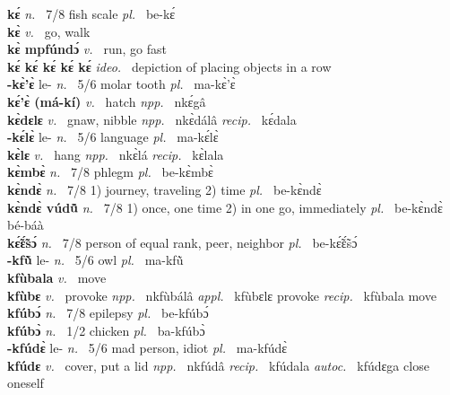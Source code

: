 {\bfseries kɛ́}  {\itshape n.~} 7/8 fish scale {\itshape pl.~} be-kɛ́    \\ 
{\bfseries kɛ̀}  {\itshape v.~} go, walk    \\ 
{\bfseries kɛ̀ mpfúndɔ́}  {\itshape v.~} run, go fast    \\ 
{\bfseries kɛ́ kɛ́ kɛ́ kɛ́ kɛ́}  {\itshape ideo.~} depiction of placing objects in a row    \\ 
{\bfseries -kɛ̀'ɛ̀} le- {\itshape n.~} 5/6 molar tooth {\itshape pl.~} ma-kɛ̀'ɛ̀    \\ 
{\bfseries kɛ́'ɛ̀ (má-kí)}  {\itshape v.~} hatch   {\itshape npp.~} nkɛ́gâ  \\ 
{\bfseries kɛ̀dɛlɛ}  {\itshape v.~} gnaw, nibble   {\itshape npp.~} nkɛ̀dálâ {\itshape recip.~} kɛ́dala  \\ 
{\bfseries -kɛ́lɛ̀} le- {\itshape n.~} 5/6 language {\itshape pl.~} ma-kɛ́lɛ̀    \\ 
{\bfseries kɛ̀lɛ}  {\itshape v.~} hang   {\itshape npp.~} nkɛ̀lá {\itshape recip.~} kɛ̀lala  \\ 
{\bfseries kɛ̀mbɛ̀}  {\itshape n.~} 7/8 phlegm {\itshape pl.~} be-kɛ̀mbɛ̀    \\ 
{\bfseries kɛ̀ndɛ̀}  {\itshape n.~} 7/8 1) journey, traveling 2) time {\itshape pl.~} be-kɛ̀ndɛ̀    \\ 
{\bfseries kɛ̀ndɛ̀ vúdũ̂}  {\itshape n.~} 7/8 1) once, one time 2) in one go, immediately {\itshape pl.~} be-kɛ̀ndɛ̀ bé-báà    \\ 
{\bfseries kɛ̃́ɛ̃́sɔ́}  {\itshape n.~} 7/8 person of equal rank, peer, neighbor {\itshape pl.~} be-kɛ̃́ɛ̃́sɔ́    \\ 
{\bfseries -kfũ̀} le- {\itshape n.~} 5/6 owl {\itshape pl.~} ma-kfũ̀    \\ 
{\bfseries kfùbala}  {\itshape v.~} move    \\ 
{\bfseries kfùbɛ}  {\itshape v.~} provoke   {\itshape npp.~} nkfùbálâ {\itshape appl.~} kfùbɛlɛ provoke {\itshape recip.~} kfùbala move  \\ 
{\bfseries kfúbɔ́}  {\itshape n.~} 7/8 epilepsy {\itshape pl.~} be-kfúbɔ́    \\ 
{\bfseries kfúbɔ̀}  {\itshape n.~} 1/2 chicken {\itshape pl.~} ba-kfúbɔ̀    \\ 
{\bfseries -kfúdɛ̀} le- {\itshape n.~} 5/6 mad person, idiot {\itshape pl.~} ma-kfúdɛ̀    \\ 
{\bfseries kfúdɛ}  {\itshape v.~} cover, put a lid   {\itshape npp.~} nkfúdâ {\itshape recip.~} kfúdala {\itshape autoc.~} kfúdɛga close oneself  \\ 
